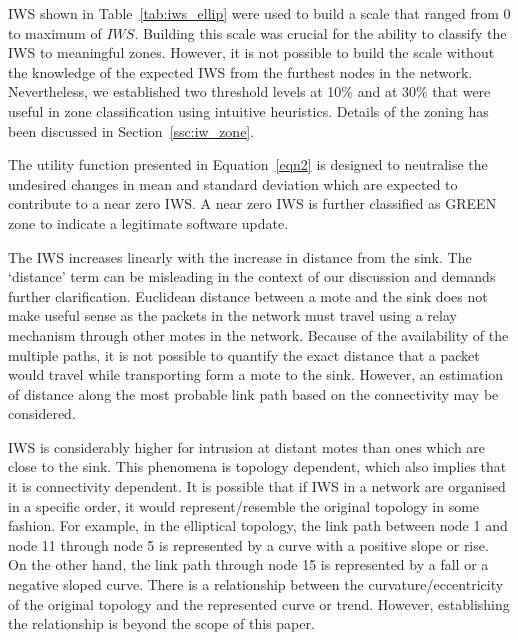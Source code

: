 \documentclass[conference,manuscript]{IEEEtran}
\newcommand{\notedme}[1]{\raisebox{0pt}[0pt][0pt]{\pdfcomment[open=true,color=blue]{#1}}}
\begin{document}
IWS shown in Table~\ref{tab:iws_ellip} were used to build a scale that ranged from $0$ to maximum of $\mathit{IWS}$.
Building this scale was crucial for the ability to classify the IWS to meaningful zones.
However, it is not possible to build the scale without the knowledge of the expected IWS from the furthest nodes in the network.
Nevertheless, we established two threshold levels at 10\% and at 30\% that were useful in zone classification using intuitive heuristics.
Details of the zoning has been discussed in Section~\ref{ssc:iw_zone}.



The utility function presented in Equation~\ref{eqn2} is designed to neutralise the undesired %
changes in mean and standard deviation which are expected to contribute to a near zero IWS.
A near zero IWS is further classified as GREEN zone to indicate a legitimate software update. 

The IWS increases linearly with the increase in distance from the sink.
The `distance' term can be misleading in the context of our discussion and demands further clarification.
Euclidean distance between a mote and the sink does not make useful sense as the packets in the network must travel using a relay mechanism through other motes in the network.
Because of the availability of the multiple paths, it is not possible to quantify the exact distance that a packet would travel while transporting form a mote to the sink.
However, an estimation of distance along the most probable link path based on the connectivity may be considered.

IWS is considerably higher for intrusion at distant motes than ones which are close to the sink.
This phenomena is topology dependent, which also implies  that it is connectivity dependent.
It is possible that if IWS in a network are organised in a specific order, it would represent/resemble   the original topology in some fashion.
For example, in the elliptical topology, the link path between node 1 and node 11 through node 5 is represented by a curve with a positive slope or rise.
On the other hand, the link path through node 15 is represented by a fall or a negative sloped curve.
There is a relationship between the curvature/eccentricity of the original topology and the represented curve or  trend.
However, establishing the relationship is beyond the scope of this paper.
\end{document}

